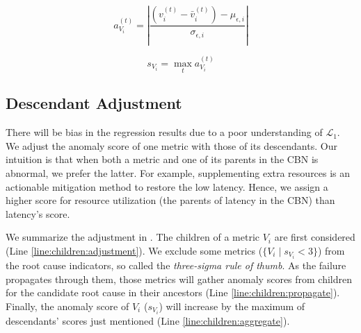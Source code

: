 \begin{equation}\label{eqn:anomaly-score:point}
	a_{V_{i}}^{(t)} = \left|\frac{\left(v_{i}^{(t)} - \bar{v}_{i}^{(t)}\right) - \mu_{\epsilon,i}}{\sigma_{\epsilon,i}}\right|
\end{equation}

\begin{equation}\label{eqn:anomaly-score}
	s_{V_{i}} = \max_{t} a_{V_{i}}^{(t)}
\end{equation}

\subsection{Descendant Adjustment}
There will be bias in the regression results due to a poor understanding of $\mathcal{L}_{1}$. 
We adjust the anomaly score of one metric with those of its descendants.
Our intuition is that when both a metric and one of its parents in the CBN is abnormal, we prefer the latter.
For example, supplementing extra resources is an actionable mitigation method to restore the low latency.
Hence, we assign a higher score for resource utilization (the parents of latency in the CBN) than latency's score.

We summarize the adjustment in .
The children of a metric $V_{i}$ are first considered (Line \ref{line:children:adjustment}).
We exclude some metrics ($\{V_{i} \mid s_{V_{i}} < 3\}$) from the root cause indicators, so called the \textit{three-sigma rule of thumb}.
As the failure propagates through them, those metrics will gather anomaly scores from children for the candidate root cause in their ancestors (Line \ref{line:children:propagate}).
Finally, the anomaly score of $V_{i}$ ($s_{V_{i}}$) will increase by the maximum of descendants' scores just mentioned (Line \ref{line:children:aggregate}).

